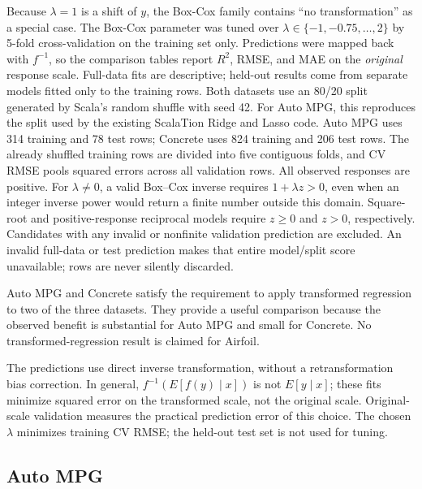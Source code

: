 \documentclass{article}
\begin{document}
Because $\lambda = 1$ is a shift of $y$, the Box-Cox family contains ``no transformation'' as a special case. The Box-Cox parameter was tuned over $\lambda \in \{-1, -0.75, \dots, 2\}$ by 5-fold cross-validation on the training set only. Predictions were mapped back with $f^{-1}$, so the comparison tables report $R^2$, RMSE, and MAE on the \emph{original} response scale. Full-data fits are descriptive; held-out results come from separate models fitted only to the training rows. Both datasets use an 80/20 split generated by Scala's random shuffle with seed 42. For Auto MPG, this reproduces the split used by the existing ScalaTion Ridge and Lasso code. Auto MPG uses 314 training and 78 test rows; Concrete uses 824 training and 206 test rows. The already shuffled training rows are divided into five contiguous folds, and CV RMSE pools squared errors across all validation rows. All observed responses are positive. For $\lambda\ne0$, a valid Box--Cox inverse requires $1+\lambda z>0$, even when an integer inverse power would return a finite number outside this domain. Square-root and positive-response reciprocal models require $z\geq0$ and $z>0$, respectively. Candidates with any invalid or nonfinite validation prediction are excluded. An invalid full-data or test prediction makes that entire model/split score unavailable; rows are never silently discarded.

Auto MPG and Concrete satisfy the requirement to apply transformed regression to two of the three datasets. They provide a useful comparison because the observed benefit is substantial for Auto MPG and small for Concrete. No transformed-regression result is claimed for Airfoil.

The predictions use direct inverse transformation, without a retransformation bias correction. In general, $f^{-1}(E[f(y)\mid x])$ is not $E[y\mid x]$; these fits minimize squared error on the transformed scale, not the original scale. Original-scale validation measures the practical prediction error of this choice. The chosen $\lambda$ minimizes training CV RMSE; the held-out test set is not used for tuning.

\subsection{Auto MPG}
\end{document}
